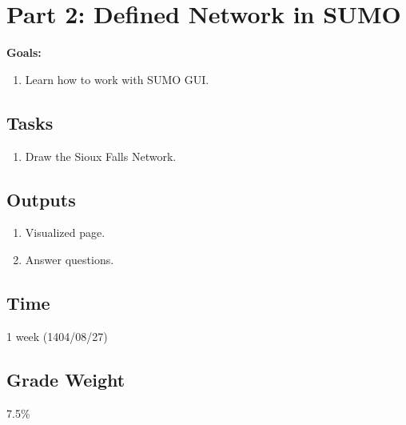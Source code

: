 \documentclass{KPS_assignment}
\begin{document}
\maketitle
\section*{Part 2: Defined Network in SUMO}

\textbf{Goals:}
\begin{enumerate}
\item Learn how to work with SUMO GUI.
\end{enumerate}

\subsection*{Tasks}
\begin{enumerate}
    \item Draw the Sioux Falls Network.
\end{enumerate}

\subsection*{Outputs}
\begin{enumerate}
\item Visualized page.
\item Answer questions.
\end{enumerate}

\subsection*{Time}
1 week (1404/08/27)

\subsection*{Grade Weight}
7.5\%
\end{document}
